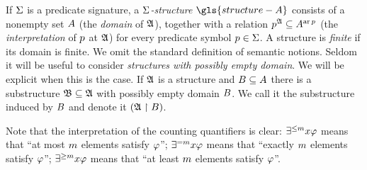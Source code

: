 
If $\mathrm{\Sigma}$ is a predicate signature, a \emph{$\mathrm{\Sigma}$-structure}
$\gls{structure-A}$ consists of a nonempty set $A$ (the \emph{domain} of
$\mathfrak{A}$), together with a relation $p^{\mathfrak{A}} \subseteq A^{\operatorname{ar}p}$ (the
\emph{interpretation} of $p$ at $\mathfrak{A}$) for every predicate symbol $p
\in \mathrm{\Sigma}$. A structure is \emph{finite} if its domain is finite.
We omit the standard definition of semantic notions.
Seldom it will be useful to consider \emph{structures with possibly empty
domain}. We will be explicit when this is the case.
If $\mathfrak{A}$ is a structure and $B \subseteq A$ there is a substructure
$\mathfrak{B} \subseteq \mathfrak{A}$ with possibly empty domain $B$. We call it the
substructure induced by $B$ and denote it $(\mathfrak{A} \restriction B)$.

Note that the interpretation of the counting quantifiers is clear:
$\exists^{\leq m}x\varphi$ means that ``at most $m$ elements satisfy $\varphi$'';
$\exists^{=m}x\varphi$ means that ``exactly $m$ elements satisfy $\varphi$'';
$\exists^{\geq m}x\varphi$ means that ``at least $m$ elements satisfy $\varphi$''.